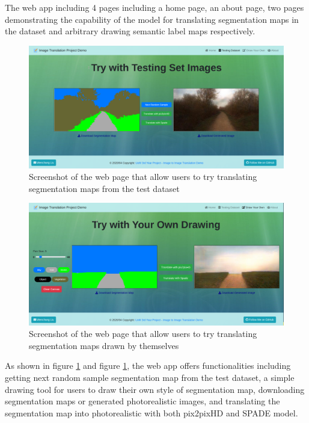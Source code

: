 The web app including 4 pages including a home page, an about page, two pages demonstrating
the capability of the model for translating segmentation maps in the dataset and arbitrary 
drawing semantic label maps respectively. 

\begin{figure}[H]
    \begin{center}
    \includegraphics[width=14cm]{figures/GUI-testset}
    \end{center}
    \caption{Screenshot of the web page that allow users to try translating segmentation maps from the test dataset}
    \label{fig:GUI-testset}
\end{figure}

\begin{figure}[H]
    \begin{center}
    \includegraphics[width=14cm]{figures/GUI-draw}
    \end{center}
    \caption{Screenshot of the web page that allow users to try translating segmentation maps drawn by themselves}
    \label{fig:GUI-draw}
\end{figure}

As shown in figure \ref{fig:GUI-testset} and figure \ref{fig:GUI-testset}, 
the web app offers functionalities including getting next random sample segmentation map from 
the test dataset, a simple drawing tool for users to draw their own style of segmentation map, 
downloading segmentation maps or generated photorealistic images, and translating the segmentation
map into photorealistic with both pix2pixHD and SPADE model.



